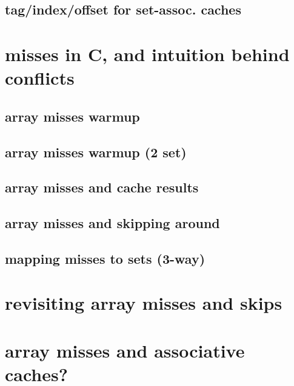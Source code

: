 \subsection{tag/index/offset for set-assoc. caches}


\section{misses in C, and intuition behind conflicts}


\subsection{array misses warmup}


\subsection{array misses warmup (2 set)}



\subsection{array misses and cache results}


\subsection{array misses and skipping around}


\subsection{mapping misses to sets (3-way)}


\section{revisiting array misses and skips}

\section{array misses and associative caches?}


